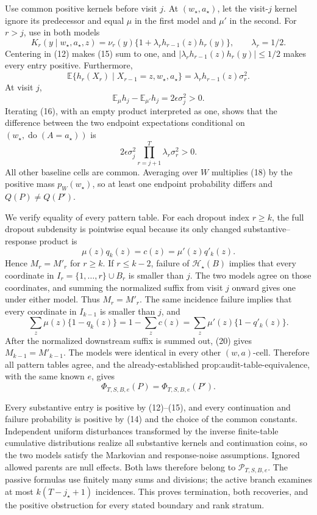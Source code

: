 Use common positive kernels before visit \(j\).  At \((w_\star,a_\star)\), let the visit-\(j\) kernel ignore its predecessor and equal \(\mu\) in the first model and \(\mu'\) in the second.  For \(r>j\), use in both models
\[
K_r(y\mid w_\star,a_\star,z)
=\nu_r(y)\{1+\lambda_r h_{r-1}(z)h_r(y)\},
\qquad \lambda_r=1/2.
\tag{15}
\]
Centering in (12) makes (15) sum to one, and
\(|\lambda_r h_{r-1}(z)h_r(y)|\le1/2\) makes every entry positive.  Furthermore,
\[
\mathbb E\{h_r(X_r)\mid X_{r-1}=z,w_\star,a_\star\}
=\lambda_r h_{r-1}(z)\sigma_r^2.
\tag{16}
\]
At visit \(j\),
\[
\mathbb E_\mu h_j-\mathbb E_{\mu'}h_j
=2\epsilon\sigma_j^2>0.
\tag{17}
\]
Iterating (16), with an empty product interpreted as one, shows that the difference between the two endpoint expectations conditional on \((w_\star,\operatorname{do}(A=a_\star))\) is
\[
2\epsilon\sigma_j^2
\prod_{r=j+1}^T\lambda_r\sigma_r^2>0.
\tag{18}
\]
All other baseline cells are common.  Averaging over \(W\) multiplies (18) by the positive mass \(p_W(w_\star)\), so at least one endpoint probability differs and \(Q(P)\ne Q(P')\).

We verify equality of every pattern table.  For each dropout index \(r\ge k\), the full dropout subdensity is pointwise equal because its only changed substantive--response product is
\[
\mu(z)q_k(z)=c(z)=\mu'(z)q'_k(z).
\tag{19}
\]
Hence \(M_r=M'_r\) for \(r\ge k\).  If \(r\le k-2\), failure of
\(\mathcal H_\star(B)\) implies that every coordinate in
\(I_r=\{1,\ldots,r\}\cup B_r\) is smaller than \(j\).  The two models agree on those coordinates, and summing the normalized suffix from visit \(j\) onward gives one under either model.  Thus \(M_r=M'_r\).  The same incidence failure implies that every coordinate in \(I_{k-1}\) is smaller than \(j\), and
\[
\sum_z\mu(z)\{1-q_k(z)\}
=1-\sum_zc(z)
=\sum_z\mu'(z)\{1-q'_k(z)\}.
\tag{20}
\]
After the normalized downstream suffix is summed out, (20) gives
\(M_{k-1}=M'_{k-1}\).  The models were identical in every other \((w,a)\)-cell.  Therefore all pattern tables agree, and the already-established
\(\text{prop:audit-table-equivalence}\), with the same known \(e\), gives
\[
\Phi_{T,S,B,e}(P)=\Phi_{T,S,B,e}(P').
\tag{21}
\]

Every substantive entry is positive by (12)--(15), and every continuation and failure probability is positive by (14) and the choice of the common constants.  Independent uniform disturbances transformed by the inverse finite-table cumulative distributions realize all substantive kernels and continuation coins, so the two models satisfy the Markovian and response-noise assumptions.  Ignored allowed parents are null effects.  Both laws therefore belong to \(\mathcal P_{T,S,B,e}\).  The passive formulas use finitely many sums and divisions; the active branch examines at most \(k(T-j_\star+1)\) incidences.  This proves termination, both recoveries, and the positive obstruction for every stated boundary and rank stratum.


